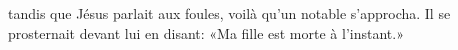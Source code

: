 \encetemps tandis que Jésus parlait aux foules,
	voilà qu’un notable s’approcha.
Il se prosternait devant lui en disant:
	«Ma fille est morte à l’instant.»
